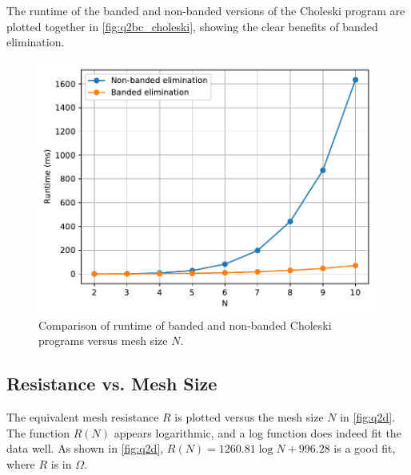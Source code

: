\documentclass[a4paper,titlepage]{article}
\begin{document}
	The runtime of the banded and non-banded versions of the Choleski program are plotted together in \autoref{fig:q2bc_choleski}, showing the clear benefits of banded elimination.

	\begin{figure}[!htb]
		\centering
		\includegraphics[width=\columnwidth]{plots/q2bc_choleski.pdf}
		\caption
		{Comparison of runtime of banded and non-banded Choleski programs versus mesh size $N$.}
		\label{fig:q2bc_choleski}
	\end{figure}
	
	\subsection{Resistance vs. Mesh Size}
	
	The equivalent mesh resistance $R$ is plotted versus the mesh size $N$ in \autoref{fig:q2d}. The function $R(N)$ appears logarithmic, and a log function does indeed fit the data well. As shown in \autoref{fig:q2d}, $R(N) = 1260.81\log{N} + 996.28$ is a good fit, where $R$ is in $\Omega$.
	
\end{document}
